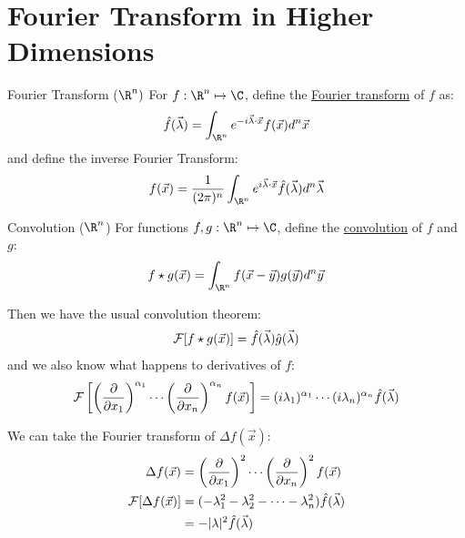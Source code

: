 \documentclass[../Main.tex]{subfiles}
\begin{document}
\section{Fourier Transform in Higher Dimensions}
\begin{definition}{Fourier Transform ($\R^n)$}
    For $f : \R^n \mapsto \C$, define the \underline{Fourier transform} of $f$ as:
    \begin{equation*}
        \hat{f}(\vec{\lambda}) = \int_{\R^n} e^{-i \vec{\lambda} \cdot \vec{x}} f(\vec{x}) d^n \vec{x}
    \end{equation*}
    and define the inverse Fourier Transform:
    \begin{equation*}
        f(\vec{x}) = \frac{1}{(2\pi)^n} \int_{\R^n} e^{i \vec{\lambda} \cdot \vec{x}} \hat{f}(\vec{\lambda}) d^n \vec{\lambda}
    \end{equation*}
\end{definition}
\begin{definition}{Convolution ($\R^n$)}
    For functions $f, g : \R^n \mapsto \C$, define the \underline{convolution} of $f$ and $g$:
    \begin{equation*}
        f \star g(\vec{x}) = \int_{\R^n} f(\vec{x} - \vec{y}) g(\vec{y}) d^n \vec{y}
    \end{equation*}
\end{definition}
Then we have the usual convolution theorem:
\begin{equation*}
    \mathcal{F}[f \star g(\vec{x})] = \hat{f}(\vec{\lambda}) \hat{g}(\vec{\lambda})
\end{equation*}
and we also know what happens to derivatives of $f$:
\begin{equation*}
    \mathcal{F}\left[\left(\frac{\partial}{\partial x_1}\right)^{\alpha_1} \cdots \left(\frac{\partial}{\partial x_n}\right)^{\alpha_n} f(\vec{x})\right] = (i \lambda_1)^{\alpha_1} \cdots (i\lambda_n)^{\alpha_n} \hat{f}(\vec{\lambda})
\end{equation*}
\begin{example}
    We can take the Fourier transform of $\Delta f(\vec{x})$:
    \begin{align*}
        \Delta f(\vec{x}) &= \left(\frac{\partial}{\partial x_1}\right)^{2} \cdots \left(\frac{\partial}{\partial x_n}\right)^{2} f(\vec{x}) \\
        \mathcal{F}[\Delta f(\vec{x})]&= (-\lambda_1^2 - \lambda_2^2 - \cdots - \lambda_n^2) \hat{f}(\vec{\lambda}) \\
        &= -|\lambda|^2 \hat{f}(\vec{\lambda})
    \end{align*}
\end{example}
\end{document}
